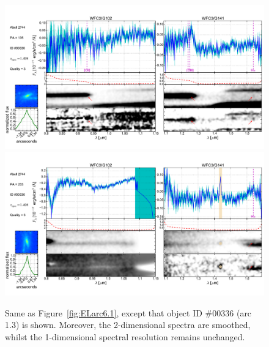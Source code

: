 \begin{figure}
    \centering
    \includegraphics[width=\textwidth]{fig/clA2744_id336_pa135_zsQ3.pdf}\\
    \includegraphics[width=\textwidth]{fig/clA2744_id336_pa233_zsQ3.pdf}
    \caption[Same as Figure~\ref{fig:ELarc6.1}, except that object ID \#00336 (arc 1.3) is shown.]{Same as Figure~\ref{fig:ELarc6.1}, except that object ID \#00336 (arc 1.3) is shown. Moreover, the 2-dimensional
  spectra are smoothed, whilst the 1-dimensional spectral resolution remains unchanged.}
    \label{fig:ELarc1.3}
\end{figure}

